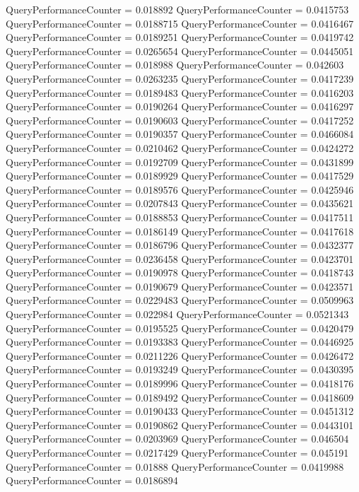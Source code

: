 \documentclass[9pt]{article}
\theoremstyle{plain}
\theoremstyle{definition}
\theoremstyle{remark}
\numberwithin{equation}{section}
\begin{document}
QueryPerformanceCounter  =  0.018892
QueryPerformanceCounter  =  0.0415753
QueryPerformanceCounter  =  0.0188715
QueryPerformanceCounter  =  0.0416467
QueryPerformanceCounter  =  0.0189251
QueryPerformanceCounter  =  0.0419742
QueryPerformanceCounter  =  0.0265654
QueryPerformanceCounter  =  0.0445051
QueryPerformanceCounter  =  0.018988
QueryPerformanceCounter  =  0.042603
QueryPerformanceCounter  =  0.0263235
QueryPerformanceCounter  =  0.0417239
QueryPerformanceCounter  =  0.0189483
QueryPerformanceCounter  =  0.0416203
QueryPerformanceCounter  =  0.0190264
QueryPerformanceCounter  =  0.0416297
QueryPerformanceCounter  =  0.0190603
QueryPerformanceCounter  =  0.0417252
QueryPerformanceCounter  =  0.0190357
QueryPerformanceCounter  =  0.0466084
QueryPerformanceCounter  =  0.0210462
QueryPerformanceCounter  =  0.0424272
QueryPerformanceCounter  =  0.0192709
QueryPerformanceCounter  =  0.0431899
QueryPerformanceCounter  =  0.0189929
QueryPerformanceCounter  =  0.0417529
QueryPerformanceCounter  =  0.0189576
QueryPerformanceCounter  =  0.0425946
QueryPerformanceCounter  =  0.0207843
QueryPerformanceCounter  =  0.0435621
QueryPerformanceCounter  =  0.0188853
QueryPerformanceCounter  =  0.0417511
QueryPerformanceCounter  =  0.0186149
QueryPerformanceCounter  =  0.0417618
QueryPerformanceCounter  =  0.0186796
QueryPerformanceCounter  =  0.0432377
QueryPerformanceCounter  =  0.0236458
QueryPerformanceCounter  =  0.0423701
QueryPerformanceCounter  =  0.0190978
QueryPerformanceCounter  =  0.0418743
QueryPerformanceCounter  =  0.0190679
QueryPerformanceCounter  =  0.0423571
QueryPerformanceCounter  =  0.0229483
QueryPerformanceCounter  =  0.0509963
QueryPerformanceCounter  =  0.022984
QueryPerformanceCounter  =  0.0521343
QueryPerformanceCounter  =  0.0195525
QueryPerformanceCounter  =  0.0420479
QueryPerformanceCounter  =  0.0193383
QueryPerformanceCounter  =  0.0446925
QueryPerformanceCounter  =  0.0211226
QueryPerformanceCounter  =  0.0426472
QueryPerformanceCounter  =  0.0193249
QueryPerformanceCounter  =  0.0430395
QueryPerformanceCounter  =  0.0189996
QueryPerformanceCounter  =  0.0418176
QueryPerformanceCounter  =  0.0189492
QueryPerformanceCounter  =  0.0418609
QueryPerformanceCounter  =  0.0190433
QueryPerformanceCounter  =  0.0451312
QueryPerformanceCounter  =  0.0190862
QueryPerformanceCounter  =  0.0443101
QueryPerformanceCounter  =  0.0203969
QueryPerformanceCounter  =  0.046504
QueryPerformanceCounter  =  0.0217429
QueryPerformanceCounter  =  0.045191
QueryPerformanceCounter  =  0.01888
QueryPerformanceCounter  =  0.0419988
QueryPerformanceCounter  =  0.0186894
\end{document}

